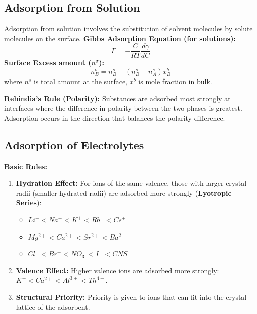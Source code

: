 \subsection{Adsorption from Solution}
Adsorption from solution involves the substitution of solvent molecules by solute molecules on the surface.
\textbf{Gibbs Adsorption Equation (for solutions):}
\begin{equation}
    \Gamma = -\frac{C}{RT} \frac{d\gamma}{dC}
\end{equation}
\textbf{Surface Excess amount ($n^\sigma$):}
\begin{equation}
    n_B^\sigma = n_B^s - (n_B^s + n_A^s) x_B^b
\end{equation}
where $n^s$ is total amount at the surface, $x^b$ is mole fraction in bulk.

\textbf{Rebindia's Rule (Polarity):} Substances are adsorbed most strongly at interfaces where the difference in polarity between the two phases is greatest. Adsorption occurs in the direction that balances the polarity difference.

\subsection{Adsorption of Electrolytes}
\textbf{Basic Rules:}
\begin{enumerate}
    \item \textbf{Hydration Effect:} For ions of the same valence, those with larger crystal radii (smaller hydrated radii) are adsorbed more strongly (\textbf{Lyotropic Series}):
        \begin{itemize}
            \item $Li^+ < Na^+ < K^+ < Rb^+ < Cs^+$
            \item $Mg^{2+} < Ca^{2+} < Sr^{2+} < Ba^{2+}$
            \item $Cl^- < Br^- < NO_3^- < I^- < CNS^-$
        \end{itemize}
    \item \textbf{Valence Effect:} Higher valence ions are adsorbed more strongly: $K^+ < Ca^{2+} < Al^{3+} < Th^{4+}$.
    \item \textbf{Structural Priority:} Priority is given to ions that can fit into the crystal lattice of the adsorbent.
\end{enumerate}

